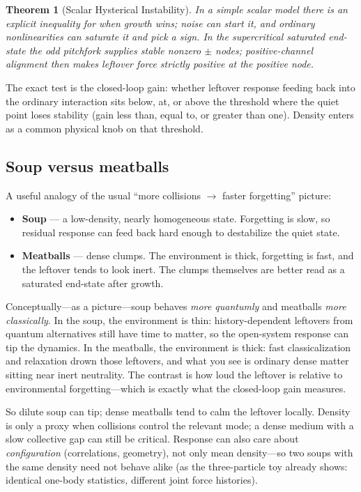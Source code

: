 \documentclass[11pt]{article}
\newtheorem{theorem}{Theorem}[section]
\theoremstyle{remark}
\begin{document}
\begin{theorem}[Scalar Hysterical Instability]
In a simple scalar model there is an explicit inequality for when growth wins; noise can start it, and ordinary nonlinearities can saturate it and pick a sign.
In the supercritical saturated end-state the odd pitchfork supplies stable nonzero $\pm$ nodes; positive-channel alignment then makes leftover force strictly positive at the positive node.
\end{theorem}

The exact test is the closed-loop gain: whether leftover response feeding back into the ordinary interaction sits below, at, or above the threshold where the quiet point loses stability (gain less than, equal to, or greater than one).
Density enters as a common physical knob on that threshold.

\subsection*{Soup versus meatballs}
A useful analogy of the usual ``more collisions $\to$ faster forgetting'' picture:
\begin{itemize}
\item \textbf{Soup} --- a low-density, nearly homogeneous state.
  Forgetting is slow, so residual response can feed back hard enough to destabilize the quiet state.
\item \textbf{Meatballs} --- dense clumps.
  The environment is thick, forgetting is fast, and the leftover tends to look inert.
  The clumps themselves are better read as a saturated end-state after growth.
\end{itemize}

Conceptually---as a picture---soup behaves \emph{more quantumly} and meatballs \emph{more classically}.
In the soup, the environment is thin: history-dependent leftovers from quantum alternatives still have time to matter, so the open-system response can tip the dynamics.
In the meatballs, the environment is thick: fast classicalization and relaxation drown those leftovers, and what you see is ordinary dense matter sitting near inert neutrality.
The contrast is how loud the leftover is relative to environmental forgetting---which is exactly what the closed-loop gain measures.

So dilute soup can tip; dense meatballs tend to calm the leftover locally.
Density is only a proxy when collisions control the relevant mode; a dense medium with a slow collective gap can still be critical.
Response can also care about \emph{configuration} (correlations, geometry), not only mean density---so two soups with the same density need not behave alike (as the three-particle toy already shows: identical one-body statistics, different joint force histories).
\end{document}
